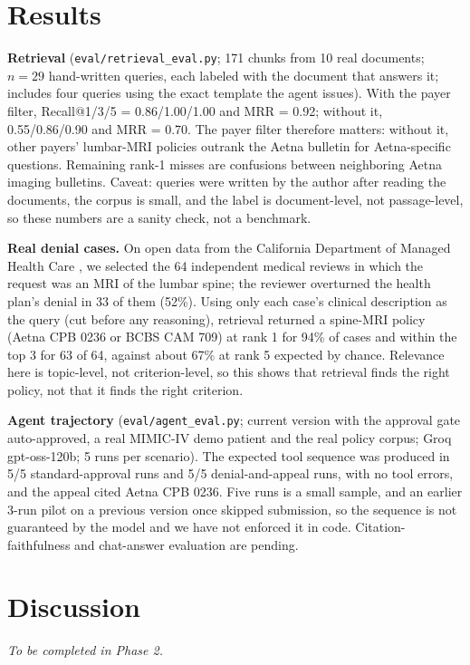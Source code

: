 \documentclass[final]{cvpr}
\begin{document}
\section{Results}
\textbf{Retrieval} (\texttt{eval/retrieval\_eval.py}; 171 chunks from 10 real documents; $n{=}29$ hand-written queries, each labeled with the document that answers it; includes four queries using the exact template the agent issues). With the payer filter, Recall@1/3/5 = 0.86/1.00/1.00 and MRR = 0.92; without it, 0.55/0.86/0.90 and MRR = 0.70. The payer filter therefore matters: without it, other payers' lumbar-MRI policies outrank the Aetna bulletin for Aetna-specific questions. Remaining rank-1 misses are confusions between neighboring Aetna imaging bulletins. Caveat: queries were written by the author after reading the documents, the corpus is small, and the label is document-level, not passage-level, so these numbers are a sanity check, not a benchmark.


\textbf{Real denial cases.} On open data from the California Department of Managed Health Care \cite{dmhc_imr}, we selected the 64 independent medical reviews in which the request was an MRI of the lumbar spine; the reviewer overturned the health plan's denial in 33 of them (52\%). Using only each case's clinical description as the query (cut before any reasoning), retrieval returned a spine-MRI policy (Aetna CPB 0236 or BCBS CAM 709) at rank 1 for 94\% of cases and within the top 3 for 63 of 64, against about 67\% at rank 5 expected by chance. Relevance here is topic-level, not criterion-level, so this shows that retrieval finds the right policy, not that it finds the right criterion.

\textbf{Agent trajectory} (\texttt{eval/agent\_eval.py}; current version with the approval gate auto-approved, a real MIMIC-IV demo patient and the real policy corpus; Groq gpt-oss-120b; 5 runs per scenario). The expected tool sequence was produced in 5/5 standard-approval runs and 5/5 denial-and-appeal runs, with no tool errors, and the appeal cited Aetna CPB 0236. Five runs is a small sample, and an earlier 3-run pilot on a previous version once skipped submission, so the sequence is not guaranteed by the model and we have not enforced it in code. Citation-faithfulness and chat-answer evaluation are pending.

\section{Discussion}
\textit{To be completed in Phase 2.}
\end{document}
